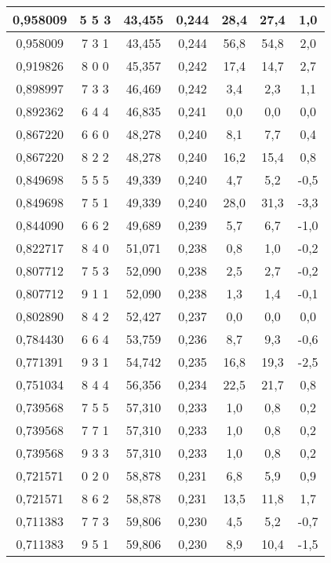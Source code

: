 \documentclass[a4paper,12pt]{article}
\numberwithin{equation}{section}
\begin{document}
\begin{appendices}
\begin{longtable}[c]{|c|c|c|c|c|c|c|}
0,958009	&	5   5   3	&	43,455	&	0,244	&	28,4	&	27,4	&	1,0	\\\hline
0,958009	&	7   3   1	&	43,455	&	0,244	&	56,8	&	54,8	&	2,0	\\\hline
0,919826	&	8   0   0	&	45,357	&	0,242	&	17,4	&	14,7	&	2,7	\\\hline
0,898997	&	7   3   3	&	46,469	&	0,242	&	3,4	&	2,3	&	1,1	\\\hline
0,892362	&	6   4   4	&	46,835	&	0,241	&	0,0	&	0,0	&	0,0	\\\hline
0,867220	&	6   6   0	&	48,278	&	0,240	&	8,1	&	7,7	&	0,4	\\\hline
0,867220	&	8   2   2	&	48,278	&	0,240	&	16,2	&	15,4	&	0,8	\\\hline
0,849698	&	5   5   5	&	49,339	&	0,240	&	4,7	&	5,2	&	-0,5	\\\hline
0,849698	&	7   5   1	&	49,339	&	0,240	&	28,0	&	31,3	&	-3,3	\\\hline
0,844090	&	6   6   2	&	49,689	&	0,239	&	5,7	&	6,7	&	-1,0	\\\hline
0,822717	&	8   4   0	&	51,071	&	0,238	&	0,8	&	1,0	&	-0,2	\\\hline
0,807712	&	7   5   3	&	52,090	&	0,238	&	2,5	&	2,7	&	-0,2	\\\hline
0,807712	&	9   1   1	&	52,090	&	0,238	&	1,3	&	1,4	&	-0,1	\\\hline
0,802890	&	8   4   2	&	52,427	&	0,237	&	0,0	&	0,0	&	0,0	\\\hline
0,784430	&	6   6   4	&	53,759	&	0,236	&	8,7	&	9,3	&	-0,6	\\\hline
0,771391	&	9   3   1	&	54,742	&	0,235	&	16,8	&	19,3	&	-2,5	\\\hline
0,751034	&	8   4   4	&	56,356	&	0,234	&	22,5	&	21,7	&	0,8	\\\hline
0,739568	&	7   5   5	&	57,310	&	0,233	&	1,0	&	0,8	&	0,2	\\\hline
0,739568	&	7   7   1	&	57,310	&	0,233	&	1,0	&	0,8	&	0,2	\\\hline
0,739568	&	9   3   3	&	57,310	&	0,233	&	1,0	&	0,8	&	0,2	\\\hline
0,721571	&	0   2   0	&	58,878	&	0,231	&	6,8	&	5,9	&	0,9	\\\hline
0,721571	&	8   6   2	&	58,878	&	0,231	&	13,5	&	11,8	&	1,7	\\\hline
0,711383	&	7   7   3	&	59,806	&	0,230	&	4,5	&	5,2	&	-0,7	\\\hline
0,711383	&	9   5   1	&	59,806	&	0,230	&	8,9	&	10,4	&	-1,5	\\\hline



\end{longtable}
\end{appendices}
\end{document}

